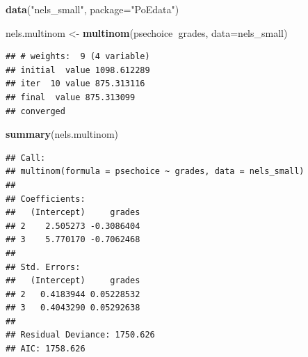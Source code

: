 \documentclass[]{book}
\newenvironment{Shaded}{\begin{snugshade}}{\end{snugshade}}
\newcommand{\DataTypeTok}[1]{\textcolor[rgb]{0.13,0.29,0.53}{#1}}
\newcommand{\FloatTok}[1]{\textcolor[rgb]{0.00,0.00,0.81}{#1}}
\newcommand{\KeywordTok}[1]{\textcolor[rgb]{0.13,0.29,0.53}{\textbf{#1}}}
\newcommand{\NormalTok}[1]{#1}
\newcommand{\OperatorTok}[1]{\textcolor[rgb]{0.81,0.36,0.00}{\textbf{#1}}}
\newcommand{\StringTok}[1]{\textcolor[rgb]{0.31,0.60,0.02}{#1}}
\begin{document}
\begin{Shaded}
\begin{Highlighting}[]
\KeywordTok{data}\NormalTok{(}\StringTok{"nels_small"}\NormalTok{, }\DataTypeTok{package=}\StringTok{"PoEdata"}\NormalTok{)}
\end{Highlighting}
\end{Shaded}

\begin{Shaded}
\begin{Highlighting}[]
\NormalTok{nels.multinom <-}\StringTok{ }\KeywordTok{multinom}\NormalTok{(psechoice}\OperatorTok{~}\NormalTok{grades, }\DataTypeTok{data=}\NormalTok{nels_small)}
\end{Highlighting}
\end{Shaded}

\begin{verbatim}
## # weights:  9 (4 variable)
## initial  value 1098.612289 
## iter  10 value 875.313116
## final  value 875.313099 
## converged
\end{verbatim}

\begin{Shaded}
\begin{Highlighting}[]
\KeywordTok{summary}\NormalTok{(nels.multinom)}
\end{Highlighting}
\end{Shaded}

\begin{verbatim}
## Call:
## multinom(formula = psechoice ~ grades, data = nels_small)
## 
## Coefficients:
##   (Intercept)     grades
## 2    2.505273 -0.3086404
## 3    5.770170 -0.7062468
## 
## Std. Errors:
##   (Intercept)     grades
## 2   0.4183944 0.05228532
## 3   0.4043290 0.05292638
## 
## Residual Deviance: 1750.626 
## AIC: 1758.626
\end{verbatim}

\begin{Shaded}
\end{Shaded}
\end{document}
